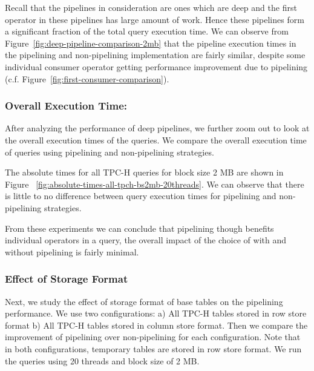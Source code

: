 Recall that the pipelines in consideration are ones which are deep and the first operator in these pipelines has large amount of work.
Hence these pipelines form a significant fraction of the total query execution time.
We can observe from Figure~\ref{fig:deep-pipeline-comparison-2mb} that the pipeline execution times in the pipelining and non-pipelining implementation are fairly similar, despite some individual consumer operator getting performance improvement due to pipelining (c.f. Figure~\ref{fig:first-consumer-comparison}). 

\subsubsection{Overall Execution Time:}\label{ssec:overall-execution-time} 
After analyzing the performance of deep pipelines, we further zoom out to look at the overall execution times of the queries. 
We compare the overall execution time of queries using pipelining and non-pipelining strategies. 

The absolute times for all TPC-H queries for block size 2 MB are shown in Figure ~\ref{fig:absolute-times-all-tpch-bs2mb-20threads}.
We can observe that there is little to no difference between query execution times for pipelining and non-pipelining strategies. 

From these experiments we can conclude that pipelining though benefits individual operators in a query, the overall impact of the choice of with and without pipelining is fairly minimal.

\subsubsection{Effect of Storage Format}
Next, we study the effect of storage format of base tables on the pipelining performance. 
We use two configurations: a) All TPC-H tables stored in row store format b) All TPC-H tables stored in column store format. 
Then we compare the improvement of pipelining over non-pipelining for each configuration. 
Note that in both configurations, temporary tables are stored in row store format. 
We run the queries using 20 threads and block size of 2 MB.

